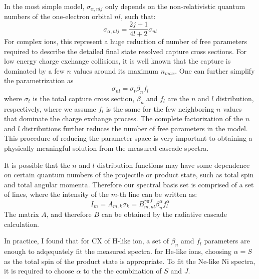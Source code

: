 \documentclass{aastex}
\begin{document}
In the most simple model, $\sigma_{\alpha,nlj}$ only depends on the
non-relativistic quantum numbers of the one-electron orbital $nl$, such that:
\begin{equation}
  \sigma_{\alpha,nlj} = \frac{2j+1}{4l+2}\sigma_{nl}
\end{equation}
For complex ions, this represent a huge reduction of number of free parameters
required to describe the detailed final state resolved capture cross
sections. For low energy charge exchange collisions, it is well known that the
capture is dominated by a few $n$ values around its maximum $n_{max}$. One can
further simplify the parametrization as
\begin{equation}
  \sigma_{nl} = \sigma_t\beta_nf_l
\end{equation}
where $\sigma_t$ is the total capture cross section, $\beta_n$ and $f_l$ are
the $n$ and $l$ distribution, respectively, where we assume $f_l$ is the same
for the few neighboring $n$ values that dominate the charge exchange
process. The complete factorization of the $n$ and $l$ distributions further
reduces the number of free parameters in the model. This procedure of reducing
the parameter space is very important to obtaining a physically meaningful
solution from the measured cascade spectra.

It is possible that the $n$ and $l$ distribution functions 
may have some dependence on certain quantum numbers of the projectile or
product state, such as total spin and total angular momenta. Therefore our
spectral basis set is comprised of a set of lines, where the intensity of the
$m$-th line can be written as:
\begin{equation}
I_m = A_{m,k}\sigma_k = B^{\gamma\pi J}_{m,nl}\beta^{\alpha}_nf^{\alpha}_l
\end{equation}
The matrix $A$, and therefore $B$ can be obtained by the radiative cascade
calculation.

In practice, I found that for CX of H-like ion, a set of $\beta_n$ amd $f_l$
parameters are enough to adqequately fit the measured spectra. for He-like
ions, choosing $\alpha = S$ as the total spin of the product state is
appropriate. To fit the Ne-like Ni spectra, it is required to choose $\alpha$
to the the combination of $S$ and $J$.
\end{document}
